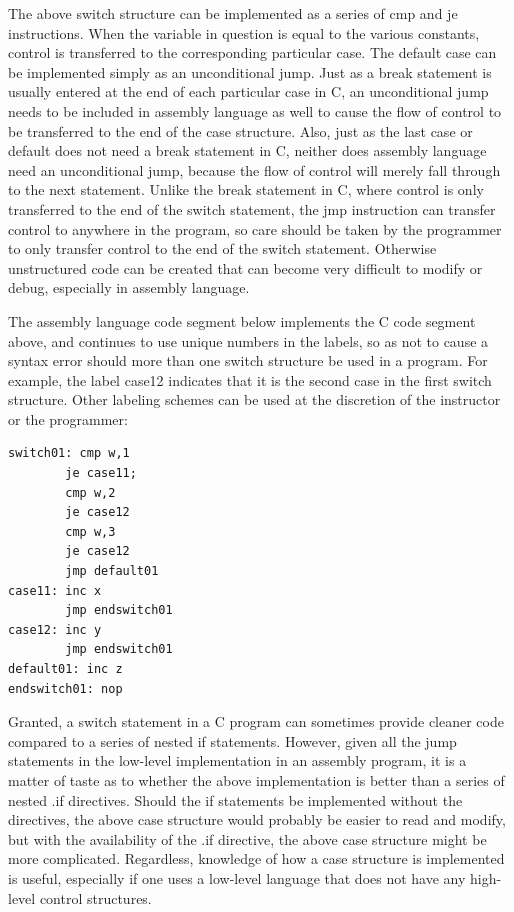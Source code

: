\documentclass[10pt]{article}
\begin{document}
The above switch structure can be implemented as a series of cmp and je instructions. When the variable in question is equal to the various constants, control is transferred to the corresponding particular case. The default case can be implemented simply as an unconditional jump. Just as a break statement is usually entered at the end of each particular case in C, an unconditional jump needs to be included in assembly language as well to cause the flow of control to be transferred to the end of the case structure. Also, just as the last case or default does not need a break statement in C, neither does assembly language need an unconditional jump, because the flow of control will merely fall through to the next statement. Unlike the break statement in C, where control is only transferred to the end of the switch statement, the jmp instruction can transfer control to anywhere in the program, so care should be taken by the programmer to only transfer control to the end of the switch statement. Otherwise unstructured code can be created that can become very difficult to modify or debug, especially in assembly language.

The assembly language code segment below implements the C code segment above, and continues to use unique numbers in the labels, so as not to cause a syntax error should more than one switch structure be used in a program. For\\
example, the label case12 indicates that it is the second case in the first switch structure. Other labeling schemes can be used at the discretion of the instructor or the programmer:

\begin{verbatim}
switch01: cmp w,1
        je case11;
        cmp w,2
        je case12
        cmp w,3
        je case12
        jmp default01
case11: inc x
        jmp endswitch01
case12: inc y
        jmp endswitch01
default01: inc z
endswitch01: nop
\end{verbatim}

Granted, a switch statement in a C program can sometimes provide cleaner code compared to a series of nested if statements. However, given all the jump statements in the low-level implementation in an assembly program, it is a matter of taste as to whether the above implementation is better than a series of nested .if directives. Should the if statements be implemented without the directives, the above case structure would probably be easier to read and modify, but with the availability of the .if directive, the above case structure might be more complicated. Regardless, knowledge of how a case structure is implemented is useful, especially if one uses a low-level language that does not have any high-level control structures.
\end{document}
